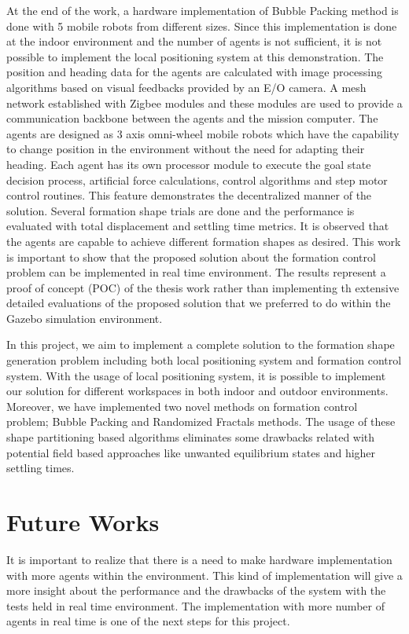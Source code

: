 At the end of the work, a hardware implementation of Bubble Packing method is done with 5 mobile robots from different sizes. Since this implementation is done at the  indoor environment and the number of agents is not sufficient, it is not possible to implement the local positioning system at this demonstration. The position and heading data for the agents are calculated with image processing algorithms based on visual feedbacks provided by an E/O camera. A mesh network established with Zigbee modules and these modules are used to provide a communication backbone between the agents and the mission computer. The agents are designed as 3 axis omni-wheel mobile robots which have the capability to change position in the environment without the need for adapting their heading. Each agent has its own processor module to execute the goal state decision process, artificial force calculations, control algorithms and step motor control routines. This feature demonstrates the decentralized manner of the solution. Several formation shape trials are done and the performance is evaluated with total displacement and settling time metrics. It is observed that the agents are capable to achieve different formation shapes as desired. This work is important to show that the proposed solution about the formation control problem can be implemented in real time environment. The results represent a proof of concept (POC) of the thesis work rather than implementing th extensive detailed evaluations of the proposed solution that we preferred to do within the Gazebo simulation environment.

In this project, we aim to implement a complete solution to the formation shape generation problem including both local positioning system and formation control system. With the usage of local positioning system, it is possible to implement our solution for different workspaces in both indoor and outdoor environments. Moreover, we have implemented two novel methods on formation control problem; Bubble Packing and Randomized Fractals methods. The usage of these shape partitioning based algorithms eliminates some drawbacks related with potential field based approaches like unwanted equilibrium states and higher settling times. 
       
\section{Future Works}
It is important to realize that there is a need to make hardware implementation with more agents within the environment. This kind of  implementation will give a more insight about the performance and the drawbacks of the system with the tests held in real time environment. The implementation with more number of agents in real time is one of the next steps for this project.
		
